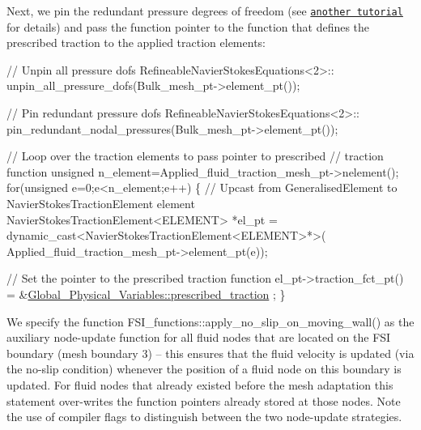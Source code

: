 Next, we pin the redundant pressure degrees of freedom (see \href{../../../navier_stokes/adaptive_driven_cavity/html/index.html}{\tt another tutorial} for details) and pass the function pointer to the function that defines the prescribed traction to the applied traction elements\+:


\begin{DoxyCodeInclude}
 
 \textcolor{comment}{// Unpin all pressure dofs}
 RefineableNavierStokesEquations<2>::
  unpin\_all\_pressure\_dofs(Bulk\_mesh\_pt->element\_pt());
 
 \textcolor{comment}{// Pin redundant pressure dofs}
 RefineableNavierStokesEquations<2>::
  pin\_redundant\_nodal\_pressures(Bulk\_mesh\_pt->element\_pt());
   
 \textcolor{comment}{// Loop over the traction elements to pass pointer to prescribed }
 \textcolor{comment}{// traction function}
 \textcolor{keywordtype}{unsigned} n\_element=Applied\_fluid\_traction\_mesh\_pt->nelement();
 \textcolor{keywordflow}{for}(\textcolor{keywordtype}{unsigned} e=0;e<n\_element;e++)
  \{
   \textcolor{comment}{// Upcast from GeneralisedElement to NavierStokesTractionElement element}
   NavierStokesTractionElement<ELEMENT> *el\_pt = 
    \textcolor{keyword}{dynamic\_cast<}NavierStokesTractionElement<ELEMENT>*\textcolor{keyword}{>}(
     Applied\_fluid\_traction\_mesh\_pt->element\_pt(e));
   
   \textcolor{comment}{// Set the pointer to the prescribed traction function}
   el\_pt->traction\_fct\_pt() = &\hyperlink{namespaceGlobal__Physical__Variables_a0de42ee6d39e85c77c16a04c3a05f7a2}{Global\_Physical\_Variables::prescribed\_traction}
      ;
  \}

\end{DoxyCodeInclude}


We specify the function {\ttfamily F\+S\+I\+\_\+functions\+::apply\+\_\+no\+\_\+slip\+\_\+on\+\_\+moving\+\_\+wall()} as the auxiliary node-\/update function for all fluid nodes that are located on the F\+SI boundary (mesh boundary 3) -- this ensures that the fluid velocity is updated (via the no-\/slip condition) whenever the position of a fluid node on this boundary is updated. For fluid nodes that already existed before the mesh adaptation this statement over-\/writes the function pointers already stored at those nodes. Note the use of compiler flags to distinguish between the two node-\/update strategies.



